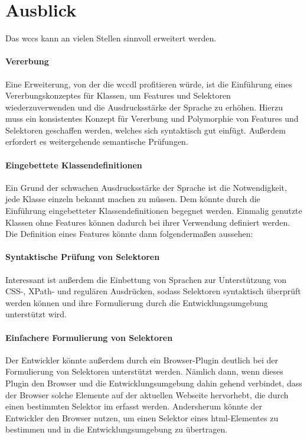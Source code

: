 \section{Ausblick}
    \label{section:endingOutlook}
    Das \gls{wccs} kann an vielen Stellen sinnvoll erweitert werden.

    \paragraph{Vererbung}
    Eine Erweiterung, von der die \gls{wccdl} profitieren würde,
    ist die Einführung eines Vererbungskonzeptes für Klassen,
    um Features und Selektoren wiederzuverwenden und die Ausdrucksstärke
    der Sprache zu erhöhen.
    Hierzu muss ein konsistentes Konzept für Vererbung und Polymorphie
    von Features und Selektoren geschaffen werden,
    welches sich syntaktisch gut einfügt.
    Außerdem erfordert es weitergehende semantische Prüfungen.

    \paragraph{Eingebettete Klassendefinitionen}
    Ein Grund der schwachen Ausdrucksstärke der Sprache ist die Notwendigkeit,
    jede Klasse einzeln bekannt machen zu müssen.
    Dem könnte durch die Einführung eingebetteter Klassendefinitionen begegnet werden.
    Einmalig genutzte Klassen ohne Features können dadurch bei ihrer Verwendung
    definiert werden.
    Die Definition eines Features könnte dann folgendermaßen aussehen:

    

    \paragraph{Syntaktische Prüfung von Selektoren}
    Interessant ist außerdem die Einbettung
    von Sprachen zur Unterstützung von CSS-, XPath- und regulären Ausdrücken,
    sodass Selektoren syntaktisch überprüft werden können
    und ihre Formulierung durch die Entwicklungsumgebung unterstützt wird.

    \paragraph{Einfachere Formulierung von Selektoren}
    Der Entwickler könnte außerdem durch ein Browser-Plugin
    deutlich bei der Formulierung von Selektoren unterstützt werden.
    Nämlich dann, wenn dieses Plugin den Browser und die Entwicklungsumgebung
    dahin gehend verbindet, dass der Browser solche Elemente auf der aktuellen Webseite
    hervorhebt, die durch einen bestimmten Selektor im {\classificationModel} erfasst werden.
    Andersherum könnte der Entwickler den Browser nutzen,
    um einen Selektor eines \gls{html}-Elementes zu bestimmen und
    in die Entwicklungsumgebung zu übertragen.


